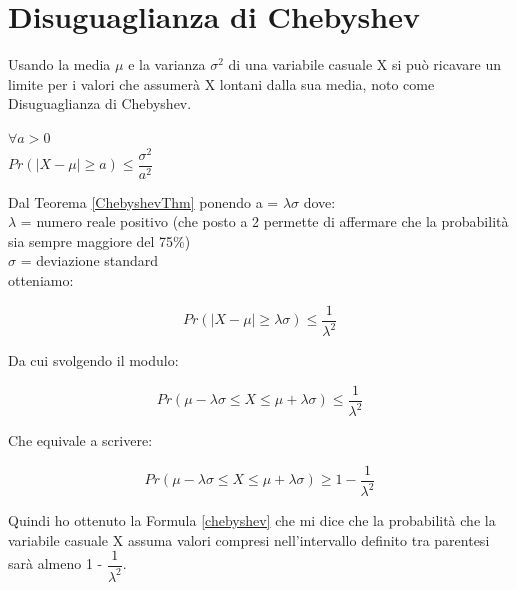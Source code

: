 \section{Disuguaglianza di Chebyshev}\label{disuguaglianzaChebyshev}
Usando la media $\mu$ e la varianza $\sigma^{2}$ di una variabile casuale X si pu\`o ricavare un limite per i valori che assumer\`a X lontani dalla sua media, noto come Disuguaglianza di Chebyshev.

\begin{theorem}
\label{ChebyshevThm}
    $\forall a > 0$\\
    $Pr(\mid X - \mu \mid \ge a) \le \dfrac{\sigma^{2}}{a^{2}}$ 
\end{theorem}

Dal Teorema \ref{ChebyshevThm} ponendo a = $\lambda\sigma$ dove:\\
$\lambda$ = numero reale positivo (che posto a 2 permette di affermare che la probabilit\`a sia sempre maggiore del 75\%)\\
$\sigma$ = deviazione standard\\
otteniamo:

\begin{equation}
    Pr(\mid X - \mu \mid \ge \lambda\sigma) \le \dfrac{1}{\lambda^{2}}
\end{equation}

Da cui svolgendo il modulo:

\begin{equation}
    Pr(\mu - \lambda\sigma \le X \le \mu + \lambda\sigma) \le \dfrac{1}{\lambda^{2}}
\end{equation}

Che equivale a scrivere:

\begin{equation}\label{chebyshev}
    Pr(\mu - \lambda\sigma \le X \le \mu + \lambda\sigma) \ge 1 - \dfrac{1}{\lambda^{2}}
\end{equation}

Quindi ho ottenuto la Formula \ref{chebyshev} che mi dice che la probabilit\`a che la variabile casuale X assuma valori compresi nell'intervallo definito tra parentesi sar\`a almeno 1 - $\dfrac{1}{\lambda^{2}}$. \cite{probAndComputing}